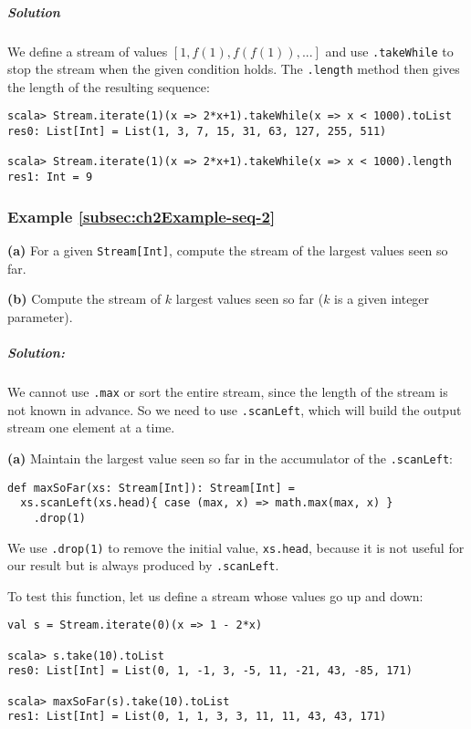 \subparagraph{Solution}

We define a stream of values $\left[1,f(1),f(f(1)),...\right]$ and
use \lstinline!.takeWhile! to stop the stream when the given condition
holds. The \lstinline!.length! method then gives the length of the
resulting sequence: 
\begin{lstlisting}
scala> Stream.iterate(1)(x => 2*x+1).takeWhile(x => x < 1000).toList
res0: List[Int] = List(1, 3, 7, 15, 31, 63, 127, 255, 511)

scala> Stream.iterate(1)(x => 2*x+1).takeWhile(x => x < 1000).length
res1: Int = 9
\end{lstlisting}


\subsubsection{Example \label{subsec:ch2Example-seq-2}\ref{subsec:ch2Example-seq-2}}

\textbf{(a)} For a given \lstinline!Stream[Int]!, compute the stream
of the largest values seen so far.

\textbf{(b)} Compute the stream of $k$ largest values seen so far
($k$ is a given integer parameter).

\subparagraph{Solution:}

We cannot use \lstinline!.max! or sort the entire stream, since the
length of the stream is not known in advance. So we need to use \lstinline!.scanLeft!,
which will build the output stream one element at a time.

\textbf{(a)} Maintain the largest value seen so far in the accumulator
of the \lstinline!.scanLeft!:
\begin{lstlisting}
def maxSoFar(xs: Stream[Int]): Stream[Int] =
  xs.scanLeft(xs.head){ case (max, x) => math.max(max, x) }
    .drop(1)
\end{lstlisting}
We use \lstinline!.drop(1)! to remove the initial value, \lstinline!xs.head!,
because it is not useful for our result but is always produced by
\lstinline!.scanLeft!.

To test this function, let us define a stream whose values go up and
down:
\begin{lstlisting}
val s = Stream.iterate(0)(x => 1 - 2*x)

scala> s.take(10).toList
res0: List[Int] = List(0, 1, -1, 3, -5, 11, -21, 43, -85, 171)

scala> maxSoFar(s).take(10).toList
res1: List[Int] = List(0, 1, 1, 3, 3, 11, 11, 43, 43, 171)
\end{lstlisting}

